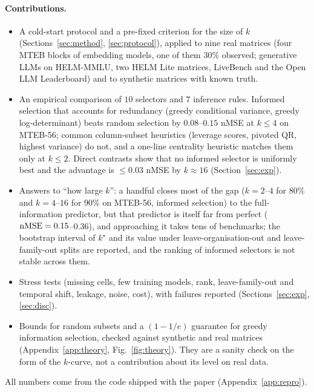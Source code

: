 \paragraph{Contributions.}
\begin{itemize}\itemsep0pt
\item A cold-start protocol and a pre-fixed criterion for the size of $k$ (Sections~\ref{sec:method}, \ref{sec:protocol}), applied to nine real matrices (four MTEB blocks of embedding models, one of them $30\%$ observed; generative LLMs on HELM-MMLU, two HELM Lite matrices, LiveBench and the Open LLM Leaderboard) and to synthetic matrices with known truth.
\item An empirical comparison of $10$ selectors and $7$ inference rules. Informed selection that accounts for redundancy (greedy conditional variance, greedy log-determinant) beats random selection by $0.08$--$0.15$ nMSE at $k\le4$ on MTEB-56; common column-subset heuristics (leverage scores, pivoted QR, highest variance) do not, and a one-line centrality heuristic matches them only at $k\le2$. Direct contrasts show that no informed selector is uniformly best and the advantage is $\le0.03$ nMSE by $k\approx16$ (Section~\ref{sec:exp}).
\item Answers to ``how large $k$'': a handful closes most of the gap ($k=2$--$4$ for $80\%$ and $k=4$--$16$ for $90\%$ on MTEB-56, informed selection) to the full-information predictor, but that predictor is itself far from perfect ($\mathrm{nMSE}=0.15$--$0.36$), and approaching it takes tens of benchmarks; the bootstrap interval of $k^\star$ and its value under leave-organisation-out and leave-family-out splits are reported, and the ranking of informed selectors is not stable across them.
\item Stress tests (missing cells, few training models, rank, leave-family-out and temporal shift, leakage, noise, cost), with failures reported (Sections~\ref{sec:exp}, \ref{sec:disc}).
\item Bounds for random subsets and a $(1-1/e)$ guarantee for greedy information selection, checked against synthetic and real matrices (Appendix~\ref{app:theory}, Fig.~\ref{fig:theory}). They are a sanity check on the form of the $k$-curve, not a contribution about its level on real data.
\end{itemize}
All numbers come from the code shipped with the paper (Appendix~\ref{app:repro}).
